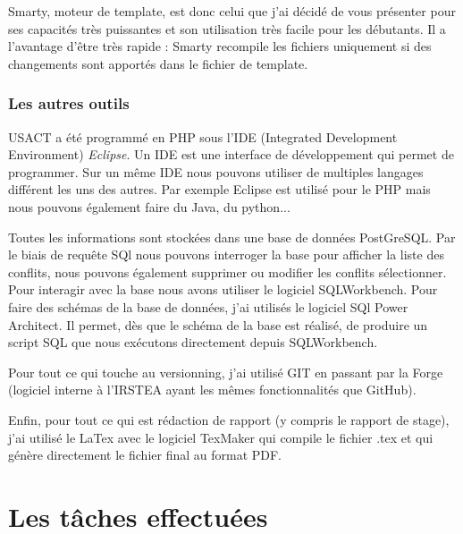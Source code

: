 \documentclass[12pt,a4paper,titlepage,twoside]{report}
\begin{document}
Smarty, moteur de template, est donc celui que j'ai décidé de vous présenter pour ses capacités très puissantes et son utilisation très facile pour les débutants. Il a l'avantage d'être très rapide : Smarty recompile les fichiers uniquement si des changements sont apportés dans le fichier de template. 

\subsection{Les autres outils}
USACT a été programmé en PHP sous l’IDE (Integrated Development Environment) \textit{Eclipse}. Un IDE est une interface de développement qui permet de programmer. \newline
Sur un même IDE nous pouvons utiliser de multiples langages différent les uns des autres. Par exemple Eclipse est utilisé pour le PHP mais nous pouvons également faire du Java, du python... \newline\newline

Toutes les informations sont stockées dans une base de données PostGreSQL. Par le biais de requête SQl nous pouvons interroger la base pour afficher la liste des conflits, nous pouvons également supprimer ou modifier les conflits sélectionner. \newline
Pour interagir avec la base nous avons utiliser le logiciel SQLWorkbench. \newline
Pour faire des schémas de la base de données, j'ai utilisés le logiciel SQl Power Architect. Il permet, dès que le schéma de la base est réalisé, de produire un script SQL que nous exécutons directement depuis SQLWorkbench.\newline\newline

Pour tout ce qui touche au versionning, j'ai utilisé GIT en passant par la Forge (logiciel interne à l'IRSTEA ayant les mêmes fonctionnalités que GitHub). \newline\newline

Enfin, pour tout ce qui est rédaction de rapport (y compris le rapport de stage), j'ai utilisé le LaTex avec le logiciel TexMaker qui compile le fichier .tex et qui génère directement le fichier final au format PDF. \newline




\cleardoublepage
\chapter{Les tâches effectuées}
\end{document}
